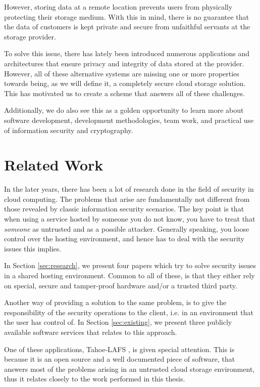 \documentclass[pdftex,english,10pt,b5paper,twoside]{book}
\begin{document}
However, storing data at a remote location prevents users from physically
protecting their storage medium. With this in mind, there is no guarantee that
the data of customers is kept private and secure from unfaithful servants at the
storage provider.

To solve this issue, there has lately been introduced numerous applications and
architectures \cite{tahoe, tccp, PasS} that ensure privacy and integrity of
data stored at the provider. However, all of these alternative systems are
missing one or more properties towards being, as we will define it, a
completely secure cloud storage solution. This has motivated us to create a
scheme that answers all of these challenges.

Additionally, we do also see this as a golden opportunity to learn more
about software development, development methodologies, team work, and practical
use of information security and cryptography.

\section{Related Work}

In the later years, there has been a lot of research done in the field of
security in cloud computing. The problems that arise are fundamentally not
different from those revealed by classic information security scenarios. The
key point is that when using a service hosted by someone you do not know, you
have to treat that \emph{someone} as untrusted and as a possible attacker.
Generally speaking, you loose control over the hosting environment, and hence
has to deal with the security issues this implies.

In Section \ref{sec:research}, we present four papers \cite{PasS,
privacymanager, tccp, microsoftresearch} which try to solve security issues in
a shared hosting environment. Common to all of these, is that they either rely
on special, secure and tamper-proof hardware and/or a trusted third party.

Another way of providing a solution to the same problem, is to give the
responsibility of the security operations to the client, i.e. in an environment
that the user has control of. In Section \ref{sec:existing}, we present three
publicly available software services that relates to this approach.

One of these applications, Tahoe-\ac{LAFS} \cite{tahoe}, is given special
attention. This is because it is an open source and a well documented piece of
software, that answers most of the problems arising in an untrusted cloud
storage environment, thus it relates closely to the work performed in this thesis.
\end{document}
